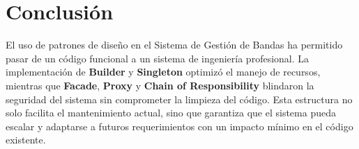 \documentclass[12pt, letterpaper]{article}
\begin{document}
\section{Conclusión}
El uso de patrones de diseño en el Sistema de Gestión de Bandas ha permitido pasar de un código funcional a un sistema de ingeniería profesional. La implementación de \textbf{Builder} y \textbf{Singleton} optimizó el manejo de recursos, mientras que \textbf{Facade}, \textbf{Proxy} y \textbf{Chain of Responsibility} blindaron la seguridad del sistema sin comprometer la limpieza del código. Esta estructura no solo facilita el mantenimiento actual, sino que garantiza que el sistema pueda escalar y adaptarse a futuros requerimientos con un impacto mínimo en el código existente.
\end{document}
